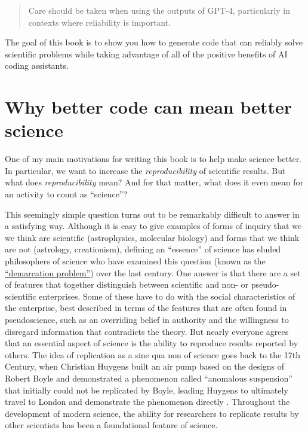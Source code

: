 \begin{quote}
Care should be taken when using the outputs of GPT-4, particularly in contexts where reliability is important. \citep{OpenAI:2024aa}
\end{quote}

The goal of this book is to show you how to generate code that can reliably solve scientific problems while taking advantage of all of the positive benefits of AI coding assistants.

\section{Why better code can mean better science}

One of my main motivations for writing this book is to help make science better.
In particular, we want to increase the \textit{reproducibility} of scientific results.
But what does \textit{reproducibility} mean? And for that matter, what does it even mean for an activity to count as ``science''?

This seemingly simple question turns out to be remarkably difficult to answer in a satisfying way.
Although it is easy to give examples of forms of inquiry that we we think are scientific (astrophysics, molecular biology) and forms that we think are not (astrology, creationism), defining an ``essence'' of science has eluded philosophers of science who have examined this question (known as the \href{https://plato.stanford.edu/entries/pseudo-science/}{``demarcation problem''}) over the last century.
One answer is that there are a set of features that together distinguish between scientific and non- or pseudo-scientific enterprises.
Some of these have to do with the social characteristics of the enterprise, best described in terms of the features that are often found in pseudoscience, such as an overriding belief in authority and the willingness to disregard information that contradicts the theory.
But nearly everyone agrees that an essential aspect of science is the ability to reproduce results reported by others.
The idea of replication as a sine qua non of science goes back to the 17th Century, when Christian Huygens built an air pump based on the designs of Robert Boyle and demonstrated a phenomenon called ``anomalous suspension'' that initially could not be replicated by Boyle, leading Huygens to ultimately travel to London and demonstrate the phenomenon directly \citep{Shapin:1985aa}.
Throughout the development of modern science, the ability for researchers to replicate results by other scientists has been a foundational feature of science.

